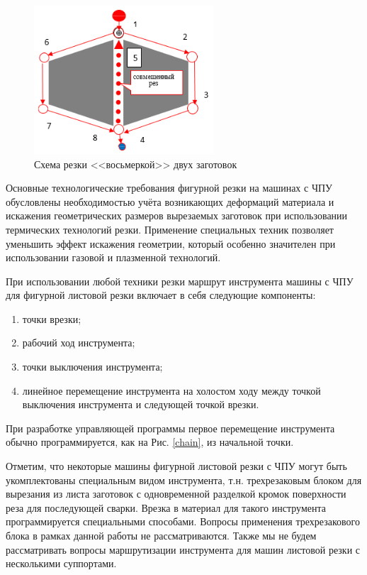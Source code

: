\documentclass[11pt,twoside]{report}
\begin{document}
\begin{figure}
  \begin{center}
  \includegraphics[width=0.6\textwidth]{8.png}
  \caption{Схема резки <<восьмеркой>> двух заготовок}
  \label{8}
  \end{center}
\end{figure}

Основные технологические требования
фигурной резки на машинах с ЧПУ обусловлены
необходимостью учёта возникающих деформаций
материала и искажения геометрических размеров
вырезаемых заготовок при использовании
термических технологий резки.
Применение специальных техник позволяет
уменьшить эффект искажения геометрии,
который особенно значителен при
использовании газовой и плазменной технологий.

При использовании любой техники резки маршрут инструмента
машины с ЧПУ для фигурной листовой резки
включает в себя следующие компоненты:
\begin{enumerate}
  \item точки врезки;
  \item рабочий ход инструмента;
  \item точки выключения инструмента;
  \item линейное перемещение инструмента на холостом ходу
  между точкой выключения инструмента и следующей точкой врезки.
\end{enumerate}

При разработке управляющей программы
первое перемещение инструмента обычно
программируется, как на Рис. \ref{chain},
из начальной точки.

Отметим, что некоторые машины фигурной листовой
резки с ЧПУ могут быть укомплектованы
специальным видом инструмента,
т.н. трехрезаковым блоком для вырезания
из листа заготовок с одновременной разделкой
кромок поверхности реза для последующей сварки.
Врезка в материал для такого инструмента
программируется специальными способами.
Вопросы применения трехрезакового блока
в рамках данной работы не рассматриваются.
Также мы не будем рассматривать вопросы
маршрутизации инструмента для машин
листовой резки с несколькими суппортами.
\end{document}
